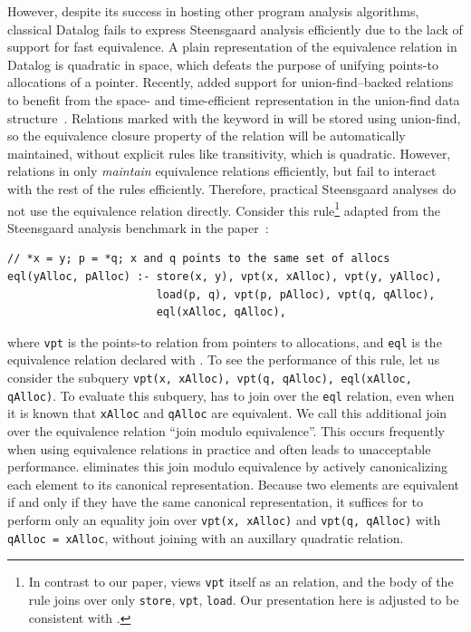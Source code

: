 However, despite its success in hosting other program analysis algorithms, 
 classical Datalog fails to express Steensgaard analysis efficiently
 due to the lack of support for fast equivalence.
A plain representation of the equivalence relation in Datalog 
 is quadratic in space, 
 which defeats the purpose of unifying points-to allocations of a pointer.
Recently, \souffle added support for union-find--backed relations
 to benefit from the space- and time-efficient representation 
 in the union-find data structure~\citep{eqrel}.
Relations marked with the \eqrel keyword in \souffle will be stored using union-find,
 so the equivalence closure property of the relation will be automatically maintained,
 without explicit rules like transitivity, which is quadratic.
However, \eqrel relations in \souffle 
 only \emph{maintain} equivalence relations efficiently,
 but fail to interact with the rest of the rules efficiently.
Therefore,
 practical Steensgaard analyses do not use the equivalence relation directly.
Consider this rule\footnote{In contrast to our paper, 
 \citet{eqrel} views \lstinline[language=Souffle]{vpt} itself as an \eqrel relation, 
 and the body of the rule joins over only 
 \lstinline[language=Souffle]{store}, \lstinline[language=Souffle]{vpt}, \lstinline[language=Souffle]{load}.
 Our presentation here is adjusted to be consistent with \cclyzerpp.} adapted from the Steensgaard analysis benchmark 
 in the \eqrel paper~\citep{eqrel}:
\begin{lstlisting}[language=Souffle]
// *x = y; p = *q; x and q points to the same set of allocs
eql(yAlloc, pAlloc) :- store(x, y), vpt(x, xAlloc), vpt(y, yAlloc),
                       load(p, q), vpt(p, pAlloc), vpt(q, qAlloc), 
                       eql(xAlloc, qAlloc),
\end{lstlisting}
where \verb|vpt| is the points-to relation from pointers to allocations,
 and \verb|eql| is the equivalence relation declared with \eqrel.
To see the performance of this rule,
 let us consider the subquery \lstinline[language=Souffle]{vpt(x, xAlloc), vpt(q, qAlloc), eql(xAlloc, qAlloc)}.
To evaluate this subquery,
 \souffle has to join over the \lstinline[language=Souffle]{eql} relation, 
 even when it is known that \lstinline[language=Souffle]{xAlloc} and \lstinline[language=Souffle]{qAlloc} are equivalent.
We call this additional join over the equivalence relation ``join modulo equivalence''.
This occurs frequently when using equivalence relations in practice 
 and often leads to unacceptable performance.
\Egglog eliminates this join modulo equivalence 
 by actively canonicalizing each element to its canonical representation.
Because two elements are equivalent if and only if they have the same canonical representation,
 it suffices for \egglog to perform only an equality join 
 over \lstinline[language=Souffle]{vpt(x, xAlloc)} and \lstinline[language=Souffle]{vpt(q, qAlloc)} with \lstinline[language=Souffle]{qAlloc = xAlloc},
 without joining with an auxillary quadratic relation.

